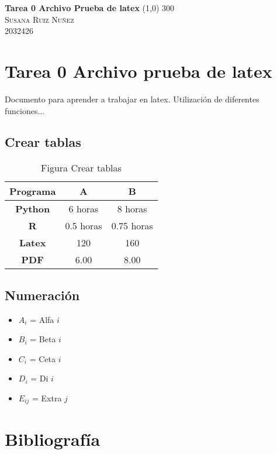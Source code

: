 \documentclass{article}
\begin{document}
\begin{titlepage}
	\begin{center}
	\huge{\textbf{Tarea 0 Archivo Prueba de latex}}
	\line(1,0) {300}\\
	
	\textsc{ \Large Susana Ruiz Nuñez \\ 2032426} 
	\end{center}
	
\end{titlepage}

\newpage
\section{Tarea 0 Archivo prueba de latex}


Documento para aprender a trabajar en latex. Utilización de diferentes funciones... \cite{Dyckhoff1990}

\subsection{Crear tablas}


\begin{table}[H]
\centering
\caption{Figura Crear tablas}
\begin{tabular}{|c|c|c|}
\hline 
\textbf{Programa} & A & B \\ 
\hline 
\textbf{Python} & 6 horas & 8 horas \\ 
\hline 
\textbf{R} & 0.5 horas & 0.75 horas \\ 
\hline 
\textbf{Latex} & 120 & 160 \\ 
\hline 
\textbf{PDF} & 6.00 & 8.00 \\ 
\hline 
\end{tabular}
\end{table}

\subsection{Numeración}
\begin{itemize}
\item $A_{i}$ = Alfa $i$ 
\item $B_{i}$ = Beta $i$
\item $C_{i}$ = Ceta $i$
\item $D_{i}$ = Di $i$
\item $E_{ij}$ = Extra $j$
\end{itemize}



\section{Bibliografía}


\end{document}
